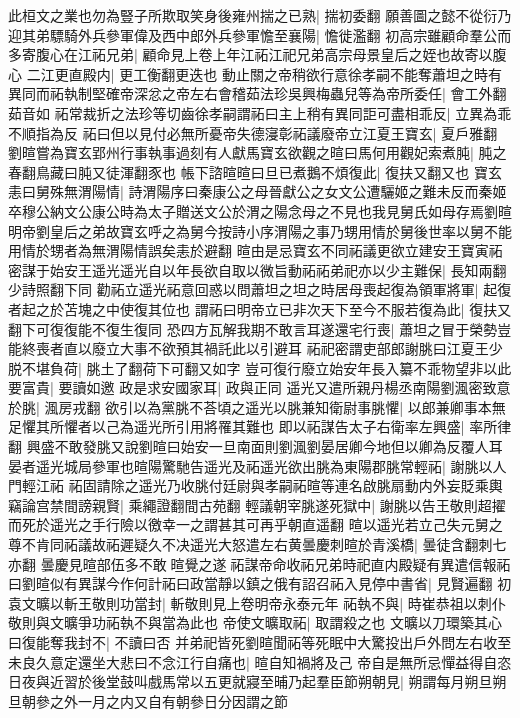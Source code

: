 此桓文之業也勿為豎子所欺取笑身後雍州揣之已熟|{
	揣初委翻}
願善圖之懿不從衍乃迎其弟驃騎外兵參軍偉及西中郎外兵參軍憺至襄陽|{
	憺徙濫翻}
初高宗雖顧命羣公而多寄腹心在江祏兄弟|{
	顧命見上卷上年江祏江祀兄弟高宗母景皇后之姪也故寄以腹心}
二江更直殿内|{
	更工衡翻更迭也}
動止關之帝稍欲行意徐孝嗣不能奪蕭坦之時有異同而祏執制堅確帝深忿之帝左右會稽茹法珍吳興梅蟲兒等為帝所委任|{
	會工外翻茹音如}
祏常裁折之法珍等切齒徐孝嗣謂祏曰主上稍有異同詎可盡相乖反|{
	立異為乖不順指為反}
祏曰但以見付必無所憂帝失德寖彰祏議廢帝立江夏王寶玄|{
	夏戶雅翻}
劉暄嘗為寶玄郢州行事執事過刻有人獻馬寶玄欲觀之暄曰馬何用觀妃索煮肫|{
	肫之春翻鳥藏曰肫又徒渾翻豕也}
帳下諮暄暄曰旦已煮鵝不煩復此|{
	復扶又翻又也}
寶玄恚曰舅殊無渭陽情|{
	詩渭陽序曰秦康公之母晉獻公之女文公遭驪姬之難未反而秦姬卒穆公納文公康公時為太子贈送文公於渭之陽念母之不見也我見舅氏如母存焉劉暄明帝劉皇后之弟故寶玄呼之為舅今按詩小序渭陽之事乃甥用情於舅後世率以舅不能用情於甥者為無渭陽情誤矣恚於避翻}
暄由是忌寶玄不同祏議更欲立建安王寶寅祏密謀于始安王遥光遥光自以年長欲自取以微旨動祏祏弟祀亦以少主難保|{
	長知兩翻少詩照翻下同}
勸祏立遥光祏意回惑以問蕭坦之坦之時居母喪起復為領軍將軍|{
	起復者起之於苫塊之中使復其位也}
謂祏曰明帝立已非次天下至今不服若復為此|{
	復扶又翻下可復復能不復生復同}
恐四方瓦解我期不敢言耳遂還宅行喪|{
	蕭坦之冒于榮勢豈能終喪者直以廢立大事不欲預其禍託此以引避耳}
祏祀密謂吏部郎謝朓曰江夏王少脱不堪負荷|{
	朓土了翻荷下可翻又如字}
豈可復行廢立始安年長入纂不乖物望非以此要富貴|{
	要讀如邀}
政是求安國家耳|{
	政與正同}
遥光又遣所親丹楊丞南陽劉渢密致意於朓|{
	渢房戎翻}
欲引以為黨朓不荅頃之遥光以脁兼知衛尉事脁懼|{
	以郎兼卿事本無足懼其所懼者以己為遥光所引用將罹其難也}
即以祏謀告太子右衛率左興盛|{
	率所律翻}
興盛不敢發朓又說劉暄曰始安一旦南面則劉渢劉晏居卿今地但以卿為反覆人耳晏者遥光城局參軍也暄陽驚馳告遥光及祏遥光欲出脁為東陽郡脁常輕祏|{
	謝朓以人門輕江祏}
祏固請除之遥光乃收朓付廷尉與孝嗣祏暄等連名啟朓扇動内外妄貶乘輿竊論宫禁間謗親賢|{
	乘繩證翻間古苑翻}
輕議朝宰朓遂死獄中|{
	謝朓以告王敬則超擢而死於遥光之手行險以徼幸一之謂甚其可再乎朝直遥翻}
暄以遥光若立己失元舅之尊不肯同祏議故祏遲疑久不决遥光大怒遣左右黄曇慶刺暄於青溪橋|{
	曇徒含翻刺七亦翻}
曇慶見暄部伍多不敢暄覺之遂祏謀帝命收祏兄弟時祀直内殿疑有異遣信報祏曰劉暄似有異謀今作何計祏曰政當靜以鎮之俄有詔召祏入見停中書省|{
	見賢遍翻}
初袁文曠以斬王敬則功當封|{
	斬敬則見上卷明帝永泰元年}
祏執不與|{
	時崔恭祖以刺仆敬則與文曠爭功祏執不與當為此也}
帝使文曠取祏|{
	取謂殺之也}
文曠以刀環築其心曰復能奪我封不|{
	不讀曰否}
并弟祀皆死劉暄聞祏等死眠中大驚投出戶外問左右收至未良久意定還坐大悲曰不念江行自痛也|{
	暄自知禍將及己}
帝自是無所忌憚益得自恣日夜與近習於後堂鼓叫戲馬常以五更就寢至晡乃起羣臣節朔朝見|{
	朔謂每月朔旦朔旦朝參之外一月之内又自有朝參日分因謂之節}
